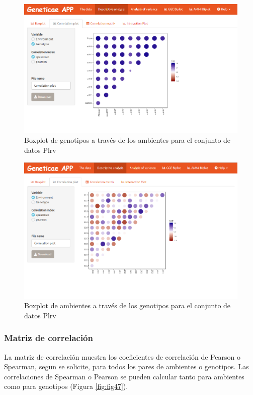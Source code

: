 \begin{figure}[H]
	\begin{center}
		\includegraphics[width=16cm]{./Graficos/corr_gen.png}
	\end{center}
	\caption{Boxplot de genotipos a través de los ambientes para el conjunto de datos Plrv}
	\label{fig:fig45}
\end{figure}


\begin{figure}[H]
	\begin{center}
		\includegraphics[width=17cm]{./Graficos/corr_withrep.png}
	\end{center}
	\caption{Boxplot de ambientes a través de los genotipos para el conjunto de datos Plrv}
	\label{fig:fig46}
\end{figure}

\subsubsection{Matriz de correlación}
La matriz de correlación muestra los coeficientes de correlación de Pearson o Spearman, segun se solicite, para todos los pares de ambientes o genotipos. Las correlaciones de Spearman o Pearson se pueden calcular tanto para ambientes como para genotipos (Figura \ref{fig:fig47}).


